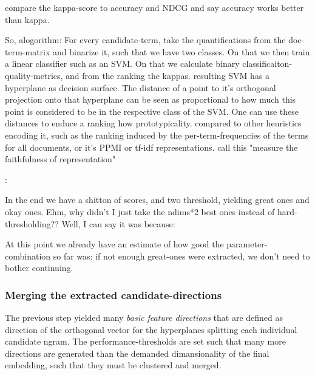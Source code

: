 \textcite{Ager2018} compare the kappa-score to accuracy and NDCG and say accuracy works better than kappa.

So, alogorithm: For every candidate-term, take the quantifications from the doc-term-matrix and binarize it, such that we have two classes. On that we then train a linear classifier such as an SVM. On that we calculate binary classificaiton-quality-metrics, and from the ranking the kappas. resulting SVM has a hyperplane as decision surface. The distance of a point to it's orthogonal projection onto that hyperplane can be seen as proportional to how much this point is considered to be in the respective class of the SVM. One can use these distances to enduce a ranking how prototypicality. compared to other heuristics encoding it, such as the ranking induced by the per-term-frequencies of the terms for all documents, or it's PPMI or tf-idf representations.
\cite{Derrac2015} call this "measure the faithfulness of representation"

\cite{Ager2018}: 


In the end we have a shitton of scores, and two threshold, yielding great ones and okay ones.
Ehm, why didn't I just take the ndims*2 best ones instead of hard-thresholding??
Well, I can say it was because:

At this point we already have an estimate of how good the parameter-combination so far was: if not enough great-ones were extracted, we don't need to bother continuing.







\subsubsection{Merging the extracted candidate-directions}
\label{sec:algo:cluster}

The previous step yielded many \textit{basic feature directions} that are defined as direction of the orthogonal vector for the hyperplanes splitting each individual candidate \gls{ngram}. The performance-thresholds are set such that many more directions are generated than the demanded dimansionality of the final embedding, such that they must be clustered and merged.

